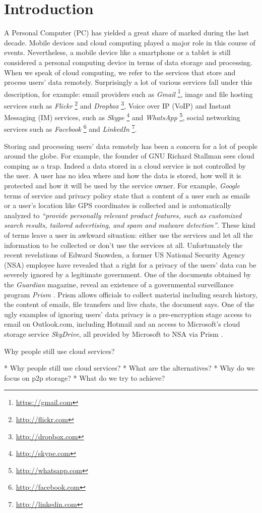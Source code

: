 \section{Introduction}

A Personal Computer (PC) has yielded a great share of marked during the
last decade. Mobile devices and cloud computing played a major role in
this course of events. Nevertheless, a mobile device like a smartphone or a
tablet is still considered a personal computing device in terms of data
storage and processing. When we speak of cloud computing, we refer to
the services that store and process users' data remotely.
Surprisingly a lot of various services fall under this description,
for example: email providers such as
\emph{Gmail} \footnote{\url{https://gmail.com}},
image and file hosting services such as
\emph{Flickr} \footnote{\url{http://flickr.com}} and
\emph{Dropbox} \footnote{\url{http://dropbox.com}},
Voice over IP (VoIP) and Instant Messaging (IM) services, such as
\emph{Skype} \footnote{\url{http://skype.com}} and
\emph{WhatsApp} \footnote{\url{http://whatsapp.com}},
social networking services such as
\emph{Facebook} \footnote{\url{http://facebook.com}} and
\emph{LinkedIn} \footnote{\url{http://linkedin.com}}.


Storing and processing users' data remotely has been a concern for
a lot of people around the globe. For example, the founder of GNU
Richard Stallman sees cloud comping as a trap\cite{stallman-cloud-08}.
Indeed a data stored in a cloud service is not controlled by the user.
A user has no idea where and how the data is stored, how well it is
protected and how it will be used by the service owner.
For example, \emph{Google} terms of service\cite{google-tos} and
privacy policy\cite{google-privacy} state that a content of a user
such as emails or a user's location like GPS coordinates is collected
and is automatically analyzed to
\emph{``provide personally relevant product
features, such as customized search results, tailored advertising,
and spam and malware detection''}.
These kind of terms leave a user
in awkward situation: either use the services and let all the information
to be collected or don't use the services at all.
Unfortunately the recent revelations\cite{snowden-timeline}
of Edward Snowden, a former US National Security Agency (NSA) employee
have revealed that a right for a privacy of the users' data can be
severely ignored by a legitimate government.
One of the documents obtained by the \emph{Guardian} magazine,
reveal an existence of a governmental surveillance program \emph{Prism}
\cite{snowden-prism}. Prism allows officials to collect
material including search history, the content of emails, file
transfers and live chats, the document says. One of the ugly examples
of ignoring users' data privacy is a pre-encryption stage access
to email on Outlook.com, including Hotmail and an access to Microsoft's
cloud storage service \emph{SkyDrive}, all provided by Microsoft to NSA
via Prism \cite{snowden-ms-nsa}.

Why people still use cloud services? 

* Why people still use cloud services?
* What are the alternatives?
* Why do we focus on p2p storage?
* What do we try to achieve?

